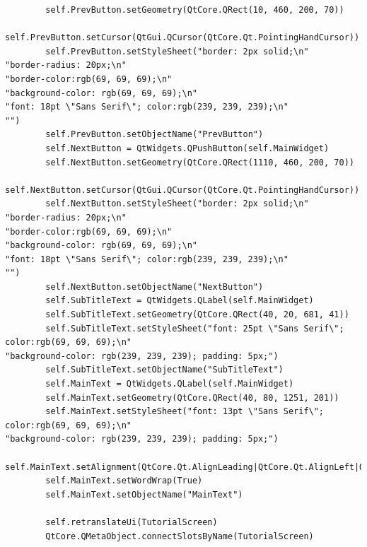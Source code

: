 \documentclass[12pt]{article}
\begin{document}
\begin{lstlisting}
        self.PrevButton.setGeometry(QtCore.QRect(10, 460, 200, 70))
        self.PrevButton.setCursor(QtGui.QCursor(QtCore.Qt.PointingHandCursor))
        self.PrevButton.setStyleSheet("border: 2px solid;\n"
"border-radius: 20px;\n"
"border-color:rgb(69, 69, 69);\n"
"background-color: rgb(69, 69, 69);\n"
"font: 18pt \"Sans Serif\"; color:rgb(239, 239, 239);\n"
"")
        self.PrevButton.setObjectName("PrevButton")
        self.NextButton = QtWidgets.QPushButton(self.MainWidget)
        self.NextButton.setGeometry(QtCore.QRect(1110, 460, 200, 70))
        self.NextButton.setCursor(QtGui.QCursor(QtCore.Qt.PointingHandCursor))
        self.NextButton.setStyleSheet("border: 2px solid;\n"
"border-radius: 20px;\n"
"border-color:rgb(69, 69, 69);\n"
"background-color: rgb(69, 69, 69);\n"
"font: 18pt \"Sans Serif\"; color:rgb(239, 239, 239);\n"
"")
        self.NextButton.setObjectName("NextButton")
        self.SubTitleText = QtWidgets.QLabel(self.MainWidget)
        self.SubTitleText.setGeometry(QtCore.QRect(40, 20, 681, 41))
        self.SubTitleText.setStyleSheet("font: 25pt \"Sans Serif\"; color:rgb(69, 69, 69);\n"
"background-color: rgb(239, 239, 239); padding: 5px;")
        self.SubTitleText.setObjectName("SubTitleText")
        self.MainText = QtWidgets.QLabel(self.MainWidget)
        self.MainText.setGeometry(QtCore.QRect(40, 80, 1251, 201))
        self.MainText.setStyleSheet("font: 13pt \"Sans Serif\"; color:rgb(69, 69, 69);\n"
"background-color: rgb(239, 239, 239); padding: 5px;")
        self.MainText.setAlignment(QtCore.Qt.AlignLeading|QtCore.Qt.AlignLeft|QtCore.Qt.AlignTop)
        self.MainText.setWordWrap(True)
        self.MainText.setObjectName("MainText")

        self.retranslateUi(TutorialScreen)
        QtCore.QMetaObject.connectSlotsByName(TutorialScreen)


\end{lstlisting}
\end{document}
